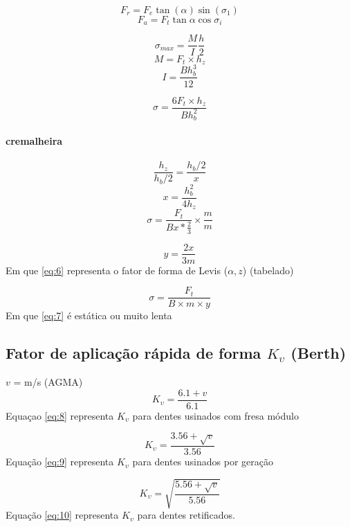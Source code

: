 \[F_{r} = F_{e} \tan (\alpha) \sin (\sigma _{1})\]
\[F_{a} = F_{t} \tan \alpha \cos \sigma _{i}\]

\[\sigma _{max} = \frac{M}{I} \frac{h}{2}\]
\[M = F_{t} \times h_{z}\]
\[I = \frac{B h_{b}^{3}}{12}\]

\[\sigma = \frac{6 F_{t} \times h_{z}}{B h_{b}^{2}}\]

\paragraph*{cremalheira}

\[\frac{h_{z}}{h_{b}/2}=\frac{h_{b}/2}{x}\]
\[x = \frac{h_{b}^{2}}{4 h_{z}}\]
\[\sigma = \frac{F_{t}}{Bx*\frac{2}{3}}\times\frac{m}{m}\]

\begin{equation}
y = \frac{2x}{3m}
\label{eq:6}
\end{equation}
Em que \ref{eq:6} representa o fator de forma de Levis ($\alpha,z$) (tabelado)

\begin{equation}
\sigma = \frac{F_{t}}{B \times m \times y}
\label{eq:7}
\end{equation}
Em que \ref{eq:7} é estática ou muito lenta



\subsection{Fator de aplicação rápida de forma $K_{\upsilon}$ (Berth)}
$v$ = m/s (AGMA)
\begin{equation}
K_{\upsilon}=\frac{6.1+v}{6.1}
\label{eq:8}
\end{equation}
Equaçao \ref{eq:8} representa $K_{\upsilon}$ para dentes usinados com fresa módulo

\begin{equation}
K_{\upsilon}=\frac{3.56+\sqrt{v}}{3.56}
\label{eq:9}
\end{equation}
Equação \ref{eq:9} representa $K_{\upsilon}$ para dentes usinados por geração

\begin{equation}
K_{\upsilon}=\sqrt{ \frac{5.56+\sqrt{v}}{5.56} }
\label{eq:10}
\end{equation}
Equação \ref{eq:10} representa $K_{\upsilon}$ para dentes retificados.

